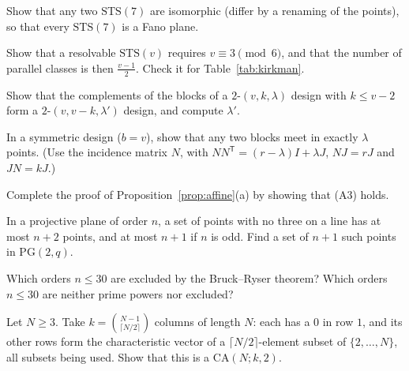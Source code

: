 \begin{exercise}[$\star\star$]\label{ex:sts7}
Show that any two $\mathrm{STS}(7)$ are isomorphic (differ by a renaming of the points), so that every $\mathrm{STS}(7)$ is a Fano plane.
\end{exercise}

\begin{exercise}[$\star$]\label{ex:resolvable}
Show that a resolvable $\mathrm{STS}(v)$ requires $v\equiv3\pmod6$, and that the number of parallel classes is then $\frac{v-1}2$. Check it for Table~\ref{tab:kirkman}.
\end{exercise}

\begin{exercise}[$\star$]\label{ex:complement}
Show that the complements of the blocks of a $2$-$(v,k,\lambda)$ design with $k\le v-2$ form a $2$-$(v,v-k,\lambda')$ design, and compute $\lambda'$.
\end{exercise}

\begin{exercise}[$\star\star$]\label{ex:symmetric}
In a symmetric design ($b=v$), show that any two blocks meet in exactly $\lambda$ points. (Use the incidence matrix $N$, with $NN^{\mathsf T}=(r-\lambda)I+\lambda J$, $NJ=rJ$ and $JN=kJ$.)
\end{exercise}

\begin{exercise}[$\star$]\label{ex:affinea3}
Complete the proof of Proposition~\ref{prop:affine}(a) by showing that (A3) holds.
\end{exercise}

\begin{exercise}[$\star\star$]\label{ex:oval}
In a projective plane of order $n$, a set of points with no three on a line has at most $n+2$ points, and at most $n+1$ if $n$ is odd. Find a set of $n+1$ such points in $\mathrm{PG}(2,q)$.
\end{exercise}

\begin{exercise}[$\star$]\label{ex:brlist}
Which orders $n\le30$ are excluded by the Bruck--Ryser theorem? Which orders $n\le30$ are neither prime powers nor excluded?
\end{exercise}

\begin{exercise}[$\star$]\label{ex:binaryca}
Let $N\ge3$. Take $k=\binom{N-1}{\lceil N/2\rceil}$ columns of length $N$: each has a $0$ in row $1$, and its other rows form the characteristic vector of a $\lceil N/2\rceil$-element subset of $\{2,\dots,N\}$,
all subsets being used. Show that this is a $\mathrm{CA}(N;k,2)$.
\end{exercise}

